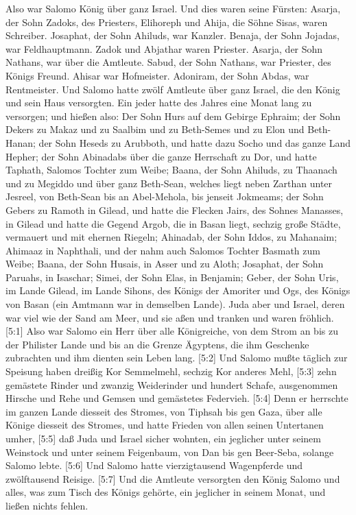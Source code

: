  Also war Salomo König über ganz Israel.  Und
dies waren seine Fürsten: Asarja, der Sohn Zadoks, des Priesters,
 Elihoreph und Ahija, die Söhne Sisas, waren Schreiber.
Josaphat, der Sohn Ahiluds, war Kanzler.  Benaja, der Sohn
Jojadas, war Feldhauptmann. Zadok und Abjathar waren Priester.
 Asarja, der Sohn Nathans, war über die Amtleute. Sabud, der
Sohn Nathans, war Priester, des Königs Freund.  Ahisar war
Hofmeister. Adoniram, der Sohn Abdas, war Rentmeister.  Und
Salomo hatte zwölf Amtleute über ganz Israel, die den König und sein
Haus versorgten. Ein jeder hatte des Jahres eine Monat lang zu
versorgen;  und hießen also: Der Sohn Hurs auf dem Gebirge
Ephraim;  der Sohn Dekers zu Makaz und zu Saalbim und zu
Beth-Semes und zu Elon und Beth-Hanan;  der Sohn Heseds zu
Arubboth, und hatte dazu Socho und das ganze Land Hepher; 
der Sohn Abinadabs über die ganze Herrschaft zu Dor, und hatte Taphath,
Salomos Tochter zum Weibe;  Baana, der Sohn Ahiluds, zu
Thaanach und zu Megiddo und über ganz Beth-Sean, welches liegt neben
Zarthan unter Jesreel, von Beth-Sean bis an Abel-Mehola, bis jenseit
Jokmeams;  der Sohn Gebers zu Ramoth in Gilead, und hatte
die Flecken Jairs, des Sohnes Manasses, in Gilead und hatte die Gegend
Argob, die in Basan liegt, sechzig große Städte, vermauert und mit
ehernen Riegeln;  Ahinadab, der Sohn Iddos, zu Mahanaim;
 Ahimaaz in Naphthali, und der nahm auch Salomos Tochter
Basmath zum Weibe;  Baana, der Sohn Husais, in Asser und zu
Aloth;  Josaphat, der Sohn Paruahs, in Isaschar;
 Simei, der Sohn Elas, in Benjamin;  Geber,
der Sohn Uris, im Lande Gilead, im Lande Sihons, des Königs der Amoriter
und Ogs, des Königs von Basan (ein Amtmann war in demselben Lande).
 Juda aber und Israel, deren war viel wie der Sand am Meer,
und sie aßen und tranken und waren fröhlich.  {[}5:1{]}
Also war Salomo ein Herr über alle Königreiche, von dem Strom an bis zu
der Philister Lande und bis an die Grenze Ägyptens, die ihm Geschenke
zubrachten und ihm dienten sein Leben lang.  {[}5:2{]} Und
Salomo mußte täglich zur Speisung haben dreißig Kor Semmelmehl, sechzig
Kor anderes Mehl,  {[}5:3{]} zehn gemästete Rinder und
zwanzig Weiderinder und hundert Schafe, ausgenommen Hirsche und Rehe und
Gemsen und gemästetes Federvieh.  {[}5:4{]} Denn er
herrschte im ganzen Lande diesseit des Stromes, von Tiphsah bis gen
Gaza, über alle Könige diesseit des Stromes, und hatte Frieden von allen
seinen Untertanen umher,  {[}5:5{]} daß Juda und Israel
sicher wohnten, ein jeglicher unter seinem Weinstock und unter seinem
Feigenbaum, von Dan bis gen Beer-Seba, solange Salomo lebte.
 {[}5:6{]} Und Salomo hatte vierzigtausend Wagenpferde und
zwölftausend Reisige.  {[}5:7{]} Und die Amtleute
versorgten den König Salomo und alles, was zum Tisch des Königs gehörte,
ein jeglicher in seinem Monat, und ließen nichts fehlen.

